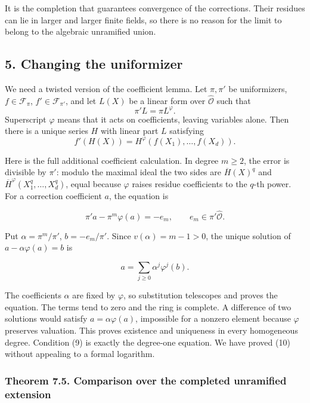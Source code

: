 \documentclass[11pt,a4paper]{article}
\begin{document}
It is the completion that guarantees convergence of the corrections.
Their residues can lie in larger and larger finite fields, so there is
no reason for the limit to belong to the algebraic unramified union.

\subsection{5. Changing the uniformizer}\label{changing-the-uniformizer}

We need a twisted version of the coefficient lemma. Let \(\pi,\pi'\) be
uniformizers, \(f\in\mathcal F_\pi\), \(f'\in\mathcal F_{\pi'}\), and
let \(L(X)\) be a linear form over \(\widehat{\mathcal O}\) such that \[
\pi'L=\pi L^\varphi.
\tag{9}
\] Superscript \(\varphi\) means that it acts on coefficients, leaving
variables alone. Then there is a unique series \(H\) with linear part
\(L\) satisfying \[
f'(H(X))=H^\varphi(f(X_1),\ldots,f(X_d)).
\tag{10}
\]

Here is the full additional coefficient calculation. In degree
\(m\geq2\), the error is divisible by \(\pi'\): modulo the maximal ideal
the two sides are \(\overline H(X)^q\) and
\(\overline H^\varphi(X_1^q,\ldots,X_d^q)\), equal because \(\varphi\)
raises residue coefficients to the \(q\)-th power. For a correction
coefficient \(a\), the equation is

\[
\pi'a-\pi^m\varphi(a)=-e_m,\qquad e_m\in\pi'\widehat{\mathcal O}.
\]

Put \(\alpha=\pi^m/\pi'\), \(b=-e_m/\pi'\). Since \(v(\alpha)=m-1>0\),
the unique solution of \(a-\alpha\varphi(a)=b\) is

\[
a=\sum_{j\geq0}\alpha^j\varphi^j(b).
\tag{11}
\]

The coefficients \(\alpha\) are fixed by \(\varphi\), so substitution
telescopes and proves the equation. The terms tend to zero and the ring
is complete. A difference of two solutions would satisfy
\(a=\alpha\varphi(a)\), impossible for a nonzero element because
\(\varphi\) preserves valuation. This proves existence and uniqueness in
every homogeneous degree. Condition (9) is exactly the degree-one
equation. We have proved (10) without appealing to a formal logarithm.

\subsubsection{Theorem 7.5. Comparison over the completed unramified
extension}\label{theorem-7.5.-comparison-over-the-completed-unramified-extension}
\end{document}
